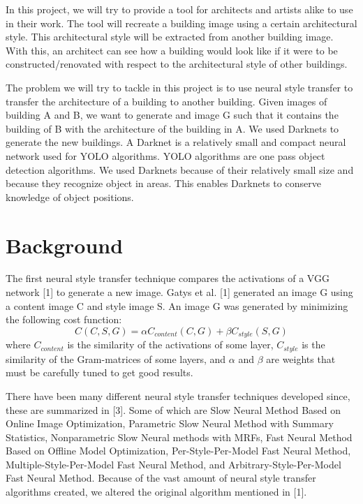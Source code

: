 \documentclass[runningheads]{llncs}
\begin{document}
In this project, we will try to provide a tool for architects and artists alike to use in their work. The tool will recreate a building image using a certain architectural style. This architectural style will be extracted from another building image. With this, an architect can see how a building would look like if it were to be constructed/renovated with respect to the architectural style of other buildings. 

The problem we will try to tackle in this project is to use neural style transfer to transfer the architecture of a building to another building. Given images of building A and B, we want to generate and image G such that it contains the building of B with the architecture of the building in A.
We used Darknets to generate the new buildings. A Darknet is a relatively small and compact neural network used for YOLO algorithms. YOLO algorithms are one pass object detection algorithms. We used Darknets because of their relatively small size and because they recognize object in areas. This enables Darknets to conserve knowledge of object positions.


\section{Background}
The first neural style transfer technique compares the activations of a VGG network [1] to generate a new image. Gatys et al. [1] generated an image G using a content image C and style image S. An image G was generated by minimizing the following cost function:
 \begin{equation}
 	C(C,S,G) = \alpha C_{content}(C,G) + \beta C_{style}(S,G)
 \end{equation}
where $C_{content}$ is the similarity of the activations of some layer, $C_{style}$ is the similarity of the Gram-matrices of some layers, and $\alpha$ and $\beta$ are weights that must be carefully tuned to get good results. 

There have been many different neural style transfer techniques developed since, these are summarized in [3]. Some of which are Slow Neural Method Based on Online Image Optimization, Parametric Slow Neural Method with Summary Statistics, Nonparametric Slow Neural methods with MRFs, Fast Neural Method Based on Offline Model Optimization, Per-Style-Per-Model Fast Neural Method, Multiple-Style-Per-Model Fast Neural Method, and Arbitrary-Style-Per-Model Fast Neural Method. Because of the vast amount of neural style transfer algorithms created, we altered the original algorithm mentioned in [1].
\end{document}
